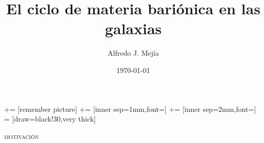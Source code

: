 \documentclass[xcolor=dvipsnames,fleqn,hyperref={colorlinks,citecolor=black,linkcolor=black,urlcolor=black}]{beamer}
\begin{document}
\footnotesize
{} += [remember picture]
    += [inner sep=1mm,font=\footnotesize]
            += [inner sep=2mm,font={\scshape}]
             = [draw=black!30,very thick]

\begin{frame}
\title{El ciclo de materia bariónica en las galaxias}
\author{Alfredo J. Mej\'ia}
\date{\today}

\maketitle
\end{frame}

\begin{frame}{\textsc{motivación}}

\begin{tikzpicture}[overlay]


\end{tikzpicture}
\end{frame}
\end{document}
